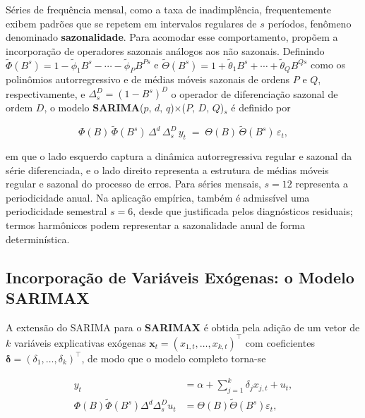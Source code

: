 Séries de frequência mensal, como a taxa de inadimplência, frequentemente
exibem padrões que se repetem em intervalos regulares de \(s\) períodos,
fenômeno denominado \textbf{sazonalidade}. Para acomodar esse comportamento,
\citet{box2015} propõem a incorporação de operadores sazonais análogos aos
não sazonais. Definindo \(\tilde{\Phi}(B^s) = 1 - \tilde{\phi}_1 B^s - \cdots - \tilde{\phi}_P B^{Ps}\)
e \(\tilde{\Theta}(B^s) = 1 + \tilde{\theta}_1 B^s + \cdots + \tilde{\theta}_Q B^{Qs}\)
como os polinômios autorregressivo e de médias móveis sazonais de ordens
\(P\) e \(Q\), respectivamente, e \(\Delta_s^D = (1-B^s)^D\) o operador de
diferenciação sazonal de ordem \(D\), o modelo
\textbf{SARIMA}(\(p,\,d,\,q\))\(\times\)(\(P,\,D,\,Q\))\(_s\) é definido
por
 
\begin{equation}
  \Phi(B)\,\tilde{\Phi}(B^s)\,\Delta^d\,\Delta_s^D\,y_t
  \;=\;
  \Theta(B)\,\tilde{\Theta}(B^s)\,\varepsilon_t,
  \label{eq:sarima}
\end{equation}
 
\noindent
em que o lado esquerdo captura a dinâmica autorregressiva regular e sazonal da
série diferenciada, e o lado direito representa a estrutura de médias móveis
regular e sazonal do processo de erros. Para séries mensais, \(s=12\) representa a periodicidade anual.
Na aplicação empírica, também é admissível uma periodicidade semestral
\(s=6\), desde que justificada pelos diagnósticos residuais; termos
harmônicos podem representar a sazonalidade anual de forma determinística.
 
\subsection{Incorporação de Variáveis Exógenas: o Modelo SARIMAX}
\label{sec:sarimax_form}
 
A extensão do SARIMA para o \textbf{SARIMAX} é obtida pela adição de um
vetor de \(k\) variáveis explicativas exógenas \(\mathbf{x}_t = (x_{1,t},
\ldots, x_{k,t})^\top\) com coeficientes \(\boldsymbol{\delta} = (\delta_1,
\ldots, \delta_k)^\top\), de modo que o modelo completo torna-se
 
\begin{equation}
\begin{aligned}
 y_t &= \alpha + \sum_{j=1}^{k} \delta_j x_{j,t}+u_t,\\
 \Phi(B)\tilde{\Phi}(B^s)\Delta^d\Delta_s^D u_t
 &= \Theta(B)\tilde{\Theta}(B^s)\varepsilon_t,
\end{aligned}
\label{eq:sarimax}
\end{equation}
 
